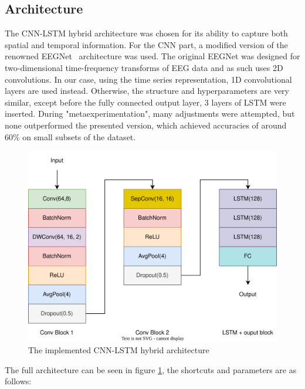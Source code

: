 \documentclass[english, he, bc, kiv, iso690alph]{fasthesis}
\begin{document}
\subsection{Architecture}

The CNN-LSTM hybrid architecture was chosen for its ability to capture both spatial and temporal information. For the CNN part, a modified version of the renowned EEGNet~\cite{lawhern:eegnet:18} architecture was used. The original EEGNet was designed for two-dimensional time-frequency transforms of EEG data and as such uses 2D convolutions. In our case, using the time series representation, 1D convolutional layers are used instead. Otherwise, the structure and hyperparameters are very similar, except before the fully connected output layer, 3 layers of LSTM were inserted. During "metaexperimentation", many adjustments were attempted, but none outperformed the presented version, which achieved accuracies of around 60\% on small subsets of the dataset.

\begin{figure}
	\centering
	\includegraphics[width=\textwidth]{fig/arch}
	\caption{The implemented CNN-LSTM hybrid architecture}
	\label{fig:arch}
\end{figure}

The full architecture can be seen in figure \ref{fig:arch}, the shortcuts and parameters are as follows:
\end{document}
